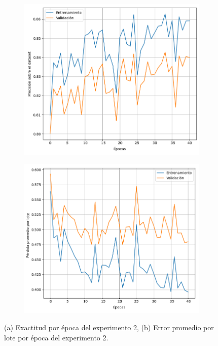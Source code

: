 \documentclass[aps,twocolumn,groupedaddress]{revtex4-2}
\begin{document}
\begin{figure}[htbp]  %
  \centering
  \begin{subfigure}[b]{0.45\textwidth}
    \centering
    \includegraphics[scale=.22]{figs/exp2/exp2_acc.png}
    \caption{}
    \label{fig:exp2_acc}
  \end{subfigure}
  \hspace{0.05\textwidth}
  \begin{subfigure}[b]{0.45\textwidth}
    \centering
    \includegraphics[scale=.22]{figs/exp2/exp2_loss.png}
    \caption{}
    \label{fig:exp2_loss}
  \end{subfigure}
  \caption{(a) Exactitud por época del experimento 2, (b) Error promedio por lote por época del experimento 2.}
  \label{fig:exp2}
\end{figure}
\end{document}
